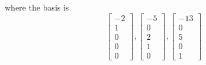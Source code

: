 \begin{enumerate}
\[\] where the basis is 
\[
  \begin{bmatrix} -2 \\ 1 \\ 0 \\ 0 \\ 0 \end{bmatrix}, 
  \begin{bmatrix} -5 \\ 0 \\ 2 \\ 1 \\ 0 \end{bmatrix},
  \begin{bmatrix} -13 \\ 0 \\ 5 \\ 0 \\ 1 \end{bmatrix}
\]

\end{enumerate}
